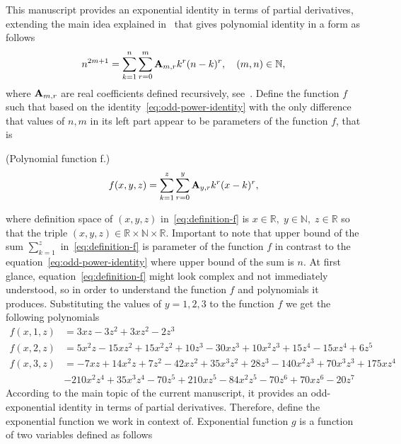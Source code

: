 This manuscript provides an exponential identity in terms of partial derivatives,
extending the main idea explained in~\cite{kolosov_2022} that gives polynomial identity in a form as follows
\begin{equation}
    n^{2m+1} = \sum_{k=1}^{n} \sum_{r=0}^{m} {\mathbf{A}} \sb{m,r} k^r (n-k)^r, \quad (m,n) \in \mathbb{N},
    \label{eq:odd-power-identity}
\end{equation}
where ${\mathbf{A}} \sb{m,r}$ are real coefficients defined recursively, see~\cite{kolosov2016link}.
Define the function $f$ such that based on the identity~\eqref{eq:odd-power-identity} with the only difference that
values of $n, m$ in its left part appear to be parameters of the function $f$, that is
\begin{definition} (Polynomial function f.)
    \begin{equation}
        f(x, y, z) = \sum_{k=1}^{z} \sum_{r=0}^{y} {\mathbf{A}} \sb{y,r} k^r (x-k)^r,
        \label{eq:definition-f}
    \end{equation}
\end{definition}
where definition space of $(x,y,z)$ in~\eqref{eq:definition-f} is $x\in \mathbb{R}, \; y\in\mathbb{N}, \; z\in\mathbb{R}$ so that
the triple $(x,y,z) \in \mathbb{R} \times \mathbb{N} \times \mathbb{R}$.
Important to note that upper bound of the sum $\sum_{k=1}^{z}$ in~\eqref{eq:definition-f} is parameter of the function $f$ in contrast
to the equation~\eqref{eq:odd-power-identity} where upper bound of the sum is $n$.
At first glance, equation~\eqref{eq:definition-f} might look complex and not immediately understood, so in order to understand
the function $f$ and polynomials it produces.
Substituting the values of $y=1,2,3$ to the function $f$ we get the following polynomials
\begin{align*}
    f(x, 1, z) &= 3 x z - 3 z^2 + 3 x z^2 - 2 z^3 \\
    f(x, 2, z) &= 5 x^2 z - 15 x z^2 + 15 x^2 z^2 + 10 z^3 - 30 x z^3 + 10 x^2 z^3 +
    15 z^4 - 15 x z^4 + 6 z^5 \\
    f(x, 3, z) &= -7 x z + 14 x^2 z + 7 z^2 - 42 x z^2 + 35 x^3 z^2 + 28 z^3 - 140 x^2 z^3 + 70 x^3 z^3 + 175 x z^4 \\
    &- 210 x^2 z^4 + 35 x^3 z^4 - 70 z^5 + 210 x z^5 - 84 x^2 z^5 - 70 z^6 + 70 x z^6 - 20 z^7
\end{align*}
According to the main topic of the current manuscript, it provides an odd-exponential identity
in terms of partial derivatives.
Therefore, define the exponential function we work in context of.
Exponential function $g$ is a function of two variables defined as follows
